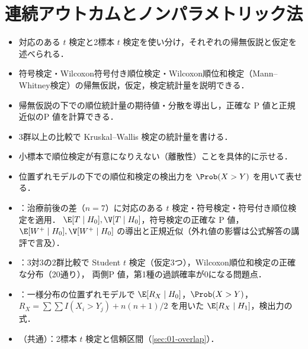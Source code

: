 \chapter{連続アウトカムとノンパラメトリック法}\label{ch:03}

\begin{goalbox}
\begin{itemize}
\item 対応のある $t$ 検定と2標本 $t$ 検定を使い分け，それぞれの帰無仮説と仮定を述べられる．
\item 符号検定・Wilcoxon符号付き順位検定・Wilcoxon順位和検定（Mann--Whitney検定）の帰無仮説，仮定，検定統計量を説明できる．
\item 帰無仮説の下での順位統計量の期待値・分散を導出し，正確な P 値と正規近似のP 値を計算できる．
\item 3群以上の比較で Kruskal--Wallis 検定の統計量を書ける．
\item 小標本で順位検定が有意になりえない（離散性）ことを具体的に示せる．
\item 位置ずれモデルの下での順位和検定の検出力を $\Prob(X>Y)$ を用いて表せる．
\end{itemize}
\end{goalbox}

\begin{exambox}
\begin{itemize}
\item {}：治療前後の差（$n=7$）に対応のある $t$ 検定・符号検定・符号付き順位検定を適用．
      $\E[T\mid H_0],\V[T\mid H_0]$，符号検定の正確な P 値，$\E[W^+\mid H_0],\V[W^+\mid H_0]$ の導出と正規近似（外れ値の影響は公式解答の講評で言及）．
\item {}：3対3の2群比較で Student $t$ 検定（仮定3つ），Wilcoxon順位和検定の正確な分布（20通り），
      両側P 値，第1種の過誤確率が0になる問題点．
\item {}：一様分布の位置ずれモデルで $\E[R_X\mid H_0]$，$\Prob(X>Y)$，$R_X=\sum\sum I(X_i>Y_j)+n(n+1)/2$ を用いた $\E[R_X\mid H_1]$，検出力の式．
\item {}（共通）：2標本 $t$ 検定と信頼区間（\cref{sec:01-overlap}）．
\end{itemize}
\end{exambox}


